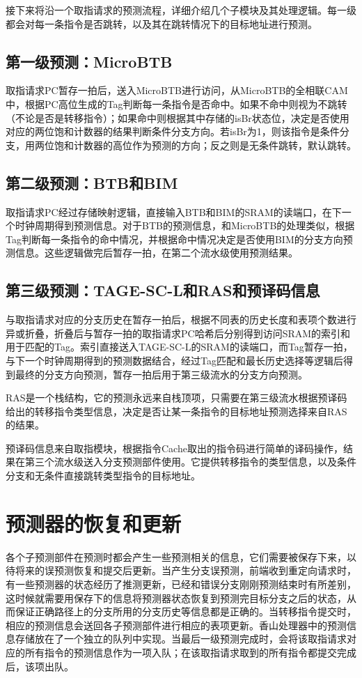 接下来将沿一个取指请求的预测流程，详细介绍几个子模块及其处理逻辑。每一级都会对每一条指令是否跳转，以及其在跳转情况下的目标地址进行预测。

\subsection{第一级预测：MicroBTB}
取指请求PC暂存一拍后，送入MicroBTB进行访问，从MicroBTB的全相联CAM中，根据PC高位生成的Tag判断每一条指令是否命中。如果不命中则视为不跳转（不论是否是转移指令）；如果命中则根据其中存储的isBr状态位，决定是否使用对应的两位饱和计数器的结果判断条件分支方向。若isBr为1，则该指令是条件分支，用两位饱和计数器的高位作为预测的方向；反之则是无条件跳转，默认跳转。

\subsection{第二级预测：BTB和BIM}
取指请求PC经过存储映射逻辑，直接输入BTB和BIM的SRAM的读端口，在下一个时钟周期得到预测信息。对于BTB的预测信息，和MicroBTB的处理类似，根据Tag判断每一条指令的命中情况，并根据命中情况决定是否使用BIM的分支方向预测信息。这些逻辑做完后暂存一拍，在第二个流水级使用预测结果。

\subsection{第三级预测：TAGE-SC-L和RAS和预译码信息}
与取指请求对应的分支历史在暂存一拍后，根据不同表的历史长度和表项个数进行异或折叠，折叠后与暂存一拍的取指请求PC哈希后分别得到访问SRAM的索引和用于匹配的Tag。索引直接送入TAGE-SC-L的SRAM的读端口，而Tag暂存一拍，与下一个时钟周期得到的预测数据结合，经过Tag匹配和最长历史选择等逻辑后得到最终的分支方向预测，暂存一拍后用于第三级流水的分支方向预测。

RAS是一个栈结构，它的预测永远来自栈顶项，只需要在第三级流水根据预译码给出的转移指令类型信息，决定是否让某一条指令的目标地址预测选择来自RAS的结果。

预译码信息来自取指模块，根据指令Cache取出的指令码进行简单的译码操作，结果在第三个流水级送入分支预测部件使用。它提供转移指令的类型信息，以及条件分支和无条件直接跳转类型指令的目标地址。

\section{预测器的恢复和更新}\label{design:restore_update}
各个子预测部件在预测时都会产生一些预测相关的信息，它们需要被保存下来，以待将来的误预测恢复和提交后更新。当产生分支误预测，前端收到重定向请求时，有一些预测器的状态经历了推测更新，已经和错误分支刚刚预测结束时有所差别，这时候就需要用保存下的信息将预测器状态恢复到预测完目标分支之后的状态，从而保证正确路径上的分支所用的分支历史等信息都是正确的。当转移指令提交时，相应的预测信息会送回各子预测部件进行相应的表项更新。香山处理器中的预测信息存储放在了一个独立的队列中实现。当最后一级预测完成时，会将该取指请求对应的所有指令的预测信息作为一项入队；在该取指请求取到的所有指令都提交完成后，该项出队。